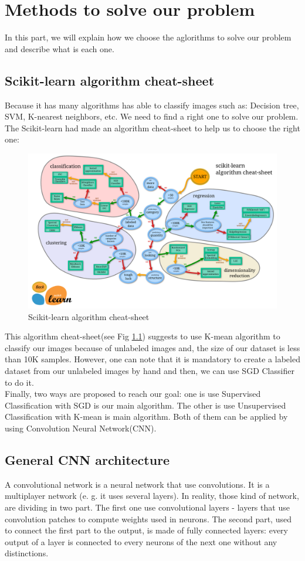 \documentclass[hidelinks,12pt,a4paper]{report}
\begin{document}
\chapter{Methods to solve our problem}
In this part, we will explain how we choose the aglorithms to solve our problem and describe what is each one.
\section{Scikit-learn algorithm cheat-sheet\cite{scikitlearn.org}}
Because it has many algorithms has able to classify images such as: Decision tree\cite{j.r.quinlan1985}, SVM\cite{stever.gunn1998}, K-nearest neighbors\cite{orenanavakfiry.levy2017}, etc. We need to find a right one to solve our problem. The Scikit-learn had made an algorithm cheat-sheet to help us to choose the right one:

\begin{figure}[ht]
	\includegraphics[width=\textwidth, center]{images/scikit-learn}
	\caption{Scikit-learn algorithm cheat-sheet}
	\label{fig:Scikit-learn}
\end{figure}
This algorithm cheat-sheet(see Fig \ref{fig:Scikit-learn}) suggests to use K-mean algorithm to classify our images because of unlabeled images and, the size of our dataset is less than 10K samples. However, one can note that it is mandatory to create a labeled dataset from our unlabeled images by hand and then, we can use SGD Classifier to do it.
\\
Finally, two ways are proposed to reach our goal: one is use Supervised Classification with SGD is our main algorithm. The other is use Unsupervised Classification with K-mean is main algorithm. Both of them can be applied by using Convolution Neural Network(CNN).
\section{General CNN architecture}
A convolutional network is a neural network that use convolutions. It is a multiplayer network (e. g. it uses several layers). In reality, those kind of network, are dividing in two part. The first one use convolutional layers - layers that use convolution patches to compute weights used in neurons. The second part, used to connect the first part to the output, is made of fully connected layers: every output of a layer is connected to every neurons of the next one without any distinctions.
\end{document}
